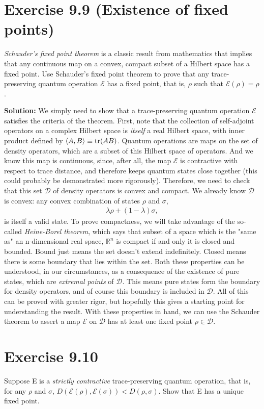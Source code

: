 \documentclass{book}
\newcommand{\mc}[1]{\mathcal{#1}}
\begin{document}
\section*{Exercise 9.9 (Existence of fixed points)} 
    \emph{Schauder's fixed point theorem} is a classic result from mathematics that implies that any continuous map on a convex, compact subset of a Hilbert space has a fixed point. Use Schauder’s fixed point theorem to prove that any trace-preserving quantum operation $\mc{E}$ has a fixed point, that is, $\rho$ such that $\mc{E}(\rho) = \rho$. 
    
    \textbf{Solution:} We simply need to show that a trace-preserving quantum operation $\mc{E}$ satisfies the criteria of the theorem. First, note that the collection of self-adjoint operators on a complex Hilbert space is \emph{itself} a real Hilbert space, with inner product defined by $\langle A, B \rangle \equiv \tr(A B)$. Quantum operations are maps on the set of density operators, which are a subset of this Hilbert space of operators. And we know this map is continuous, since, after all, the map $\mc{E}$ is contractive with respect to trace distance, and therefore keeps quantum states close together (this could probably be demonstrated more rigorously). Therefore, we need to check that this set $\mc{D}$ of density operators is convex and compact. We already know $\mc{D}$ is convex: any convex combination of states $\rho$ and $\sigma$, 
    \begin{align}
        \lambda \rho + (1-\lambda) \sigma,
    \end{align} is itself a valid state. To prove compactness, we will take advantage of the so-called \emph{Heine-Borel theorem}, which says that subset of a space which is the "same as" an n-dimensional real space, $\mathbb{R}^n$ is compact if and only it is closed and bounded. Bound just means the set doesn't extend indefinitely. Closed means there is some boundary that lies within the set. Both these properties can be understood, in our circumstances, as a consequence of the existence of pure states, which are \emph{extremal points} of $\mc{D}$. This means pure states form the boundary for density operators, and of course this boundary is included in $\mc{D}$. All of this can be proved with greater rigor, but hopefully this gives a starting point for understanding the result. With these properties in hand, we can use the Schauder theorem to assert a map $\mc{E}$ on $\mc{D}$ has at least one fixed point $\rho \in \mc{D}$.
    
\section*{Exercise 9.10}
    Suppose E is a \emph{strictly contractive} trace-preserving quantum operation, that is, for any $\rho$ and $\sigma$, $D(\mc{E}(\rho), \mc{E}(\sigma)) < D(\rho, \sigma)$. Show that E has a unique fixed point.
    
\end{document}
